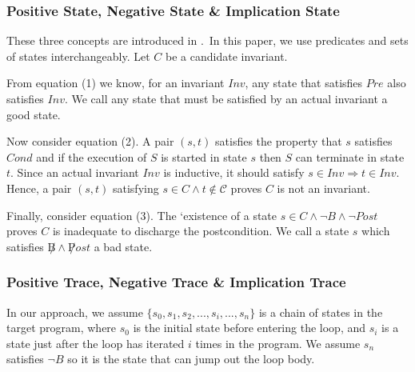 \subsubsection*{Positive State, Negative State \& Implication State}

These three concepts are introduced in \cite{sharma2014invariant}.\
In this paper, we use predicates and sets of states interchangeably.
Let $C$ be a candidate invariant.

From equation (1) we know, for an invariant $Inv$, 
any state that satisfies $Pre$ also satisfies $Inv$. 
We call any state that must be satisfied by an actual invariant a good state. 


Now consider equation (2).
A pair $(s, t)$ satisfies the property that $s$ satisfies $Cond$ and if the execution of $S$
is started in state $s$ then $S$ can terminate in state $t$. 
Since an actual invariant $Inv$ is inductive, it should satisfy $s \in {Inv} \Rightarrow t \in {Inv}$. 
Hence, a pair $(s, t)$ satisfying $s \in C \land t \notin \mathcal{C}$ proves $C$ is not an invariant. 

Finally, consider equation (3).
The `existence of a state $s \in C \wedge \neg B \wedge \neg Post$ proves $C$ is inadequate to discharge the postcondition. 
We call a state $s$ which satisfies $\not B \land \not Post$ a bad state. 



\subsubsection*{Positive Trace, Negative Trace \& Implication Trace}
In our approach, we assume $\{s_0, s_1, s_2, ..., s_i, ... , s_n\}$ is a chain of states in the target program,
where $s_0$ is the initial state before entering the loop, 
and $s_i$ is a state just after the loop has iterated $i$ times in the program.
We assume $s_n$ satisfies $\neg B$ so it is the state that can jump out the loop body.



